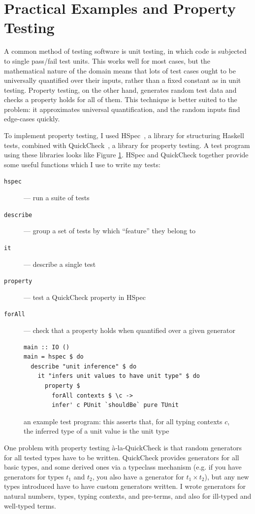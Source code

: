 \section{Practical Examples and Property Testing}
A common method of testing software is unit testing, in which code is subjected to single pass/fail test units.
This works well for most cases, but the mathematical nature of the domain means that lots of test cases ought to be universally quantified over their inputs, rather than a fixed constant as in unit testing.
Property testing, on the other hand, generates random test data and checks a property holds for all of them.
This technique is better suited to the problem: it approximates universal quantification, and the random inputs find edge-cases quickly.

To implement property testing, I used HSpec~\cite{hspec}, a library for structuring Haskell tests, combined with QuickCheck~\cite{quickcheck}, a library for property testing.
A test program using these libraries looks like Figure \ref{fig:example-test}.
HSpec and QuickCheck together provide some useful functions which I use to write my tests:
\begin{description}
\item[\texttt{hspec}] --- run a suite of tests
\item[\texttt{describe}] --- group a set of tests by which ``feature'' they belong to
\item[\texttt{it}] --- describe a single test
\item[\texttt{property}] --- test a QuickCheck property in HSpec
\item[\texttt{forAll}] --- check that a property holds when quantified over a given generator
\end{description}

\begin{figure}
\begin{verbatim}
main :: IO ()
main = hspec $ do
  describe "unit inference" $ do
    it "infers unit values to have unit type" $ do
      property $
        forAll contexts $ \c ->
        infer' c PUnit `shouldBe` pure TUnit
\end{verbatim}
\caption{an example test program: this asserts that, for all typing contexts \(c\), the inferred type of a unit value is the unit type}
\label{fig:example-test}
\end{figure}

One problem with property testing \`a-la-QuickCheck is that random generators for all tested types have to be written.
QuickCheck provides generators for all basic types, and some derived ones via a typeclass mechanism (e.g. if you have generators for types \(t_1\) and \(t_2\), you also have a generator for \(t_1 \times t_2\)), but any new types introduced have to have custom generators written.
I wrote generators for natural numbers, types, typing contexts, and pre-terms, and also for ill-typed and well-typed terms.

